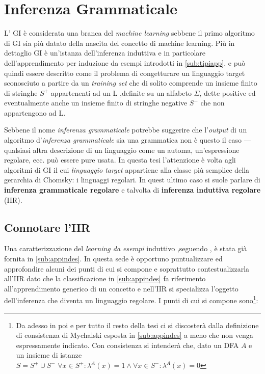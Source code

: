 
\chapter{Inferenza Grammaticale} %
\label{cap:due}

L' \ac{GI} è considerata una branca del \textit{machine learning} sebbene il primo algoritmo di \ac{GI} sia più datato della nascita del concetto di machine learning. Più in dettaglio \ac{GI} è un'istanza dell'inferenza induttiva e in particolare dell'apprendimento per induzione da esempi introdotti in \ref{sub:tipiapp}, e può quindi essere descritto come il problema di congetturare un linguaggio target sconosciuto  a partire da un \textit{training set} che di solito comprende un insieme finito di stringhe $S^{+}$ appartenenti ad un \ac{L} ,definite su un alfabeto $\Sigma$, dette positive ed eventualmente anche un insieme finito di stringhe negative $S^{-}$ che non appartengono ad \ac{L}.

Sebbene il nome \textit{inferenza grammaticale} potrebbe suggerire che l'\textit{output} di un algoritmo d'\textit{inferenza grammaticale} sia una grammatica non è questo il caso --- qualsiasi altra descrizione di un linguaggio come un automa, un'espressione regolare, ecc. può essere pure usata. In questa tesi l'attenzione è volta agli algoritmi di \ac{GI} il cui \textit{linguaggio target}  appartiene alla classe più semplice della gerarchia di Chomsky: i linguaggi regolari. In quest ultimo caso si suole parlare di \textbf{inferenza grammaticale regolare} e talvolta di \textbf{inferenza induttiva regolare} (\ac{IIR}).

\section{Connotare l'IIR}
Una caratterizzazione del \textit{learning da esempi}  induttivo  ,seguendo \cite{Mic86a}, è stata già fornita in \ref{sub:appindes}. In questa sede è opportuno puntualizzare ed approfondire alcuni dei punti di cui si compone e soprattutto contestualizzarla all'\ac{IIR} dato che la classificazione in \ref{sub:appindes} fa riferimento all'apprendimento generico di un concetto e nell'\ac{IIR} si specializza l'oggetto dell'inferenza che diventa un linguaggio regolare.  I punti di cui si compone sono\footnote{Da adesso in poi e per tutto il resto della tesi ci si discosterà dalla definizione di consistenza di Mychalski esposta in \ref{sub:appindes} a meno che non venga espressamente indicato. Con consistenza si intenderà che, dato un \ac{DFA} $A$ e un insieme di istanze $S=S^{+} \cup S^{-} \,\, \forall x \in S^{+} :   \lambda^{A}(x)=1 \land \forall x \in S^{-} :   \lambda^{A}(x)=0$ }:

